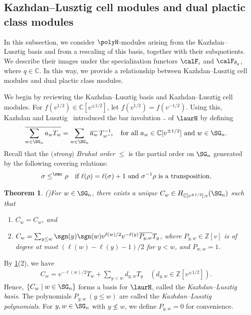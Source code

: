\documentclass[12pt, reqno]{amsart}
\theoremstyle{plain}
\newtheorem{theorem}{Theorem}[section]
\theoremstyle{definition}
\numberwithin{equation}{section}
\numberwithin{figure}{section}
\numberwithin{table}{section}
\def\Z{\mathbb Z}
\def\C{\mathbb C}
\begin{document}
\subsection{Kazhdan--Lusztig cell modules and dual plactic class modules}\label{subsec: 0-Hecke module from specialization 2}

In this subsection, we consider $\polyH$-modules arising from the
Kazhdan--Lusztig basis and from a rescaling of this basis, together with
their subquotients. We describe their images under the specialization
functors $\calF_\iota$ and $\calF_{\theta_q}$, where $q \in \C$.
In this way, we provide a relationship between
Kazhdan--Lusztig cell modules and dual plactic class modules.


We begin by reviewing the Kazhdan--Lusztig basis and Kazhdan--Lusztig cell modules.
For $f(v^{1/2}) \in \C[v^{\pm 1/2}]$, let $\overline{f(v^{1/2})} = f(v^{-1/2})$.
Using this, Kazhdan and Lusztig~\cite{79KL} introduced the bar involution  $\bar{~}\bar{~}$ of $\laurH$ by defining
\[
\overline{\sum_{w\in\SG_n} a_w T_w} = \sum_{w\in\SG_n} \overline{a_w} \, T_{w^{-1}}^{-1}  \quad \text{for all $a_w \in \C[v^{\pm1/2}]$ and $w \in \SG_n$}.
\]
Recall that the \emph{$($strong$)$ Bruhat order} $\leq$ is the partial order on $\SG_n$ generated by the following covering relations:
\[
\sigma \leq^{\rmc} \rho \quad\text{if $\ell(\rho) = \ell(\sigma)+1$ and $\sigma^{-1} \rho$ is a transposition.}
\]



\begin{theorem}{\rm (\cite[Theorem 1.1]{79KL})}\label{thm: KL basis thm}
For $w \in \SG_n$, 
there exists a unique $C_w \in H_{\C[v^{\pm 1/2}];v}(\SG_{n})$ such that 
\begin{enumerate}[label = {\rm (\arabic*)}]
\item 
$\overline{C_w} = C_w$, and
\item
$C_w = \sum_{y \le w} \sgn(y)\sgn(w) v^{\ell(w)/2} v^{-\ell(y)} \overline{P_{y,w}} T_y$,
where $P_{y,w} \in \Z[v]$ is of degree at most $(\ell(w) - \ell(y) - 1)/2$ for $y < w$, and $P_{w,w} = 1$.
\end{enumerate}
\end{theorem}
By \cref{thm: KL basis thm}(2), we have 
\begin{align}\label{eq: Kazhdan Lusztig basis elt into standard basis}
C_w = v^{-\ell(w)/2} T_w + \sum_{y < w} d_{y, w} T_y \quad (d_{y,w} \in \Z[v^{\pm 1/2}]).
\end{align}
Hence, $\{C_w \mid w \in \SG_n\}$  forms a basis for $\laurH$, called the \emph{Kazhdan--Lusztig basis}.
The polynomials $P_{y,w}~(y \le w)$ are called the \emph{Kazhdan--Lusztig polynomials}.
For $y,w \in \SG_n$ with $y \not\le w$, we define $P_{y,w} = 0$ for convenience.
\end{document}
